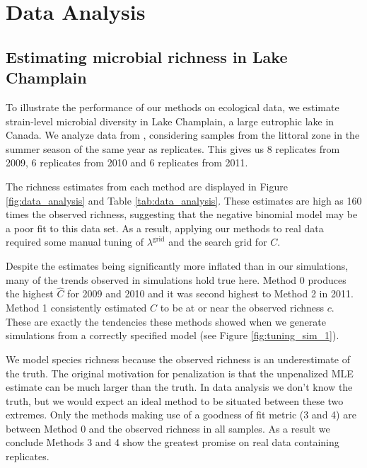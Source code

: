 \documentclass[12pt]{article}
\newcommand{\lambdagrid}{\lambda^{\text{grid}}}
\theoremstyle{break}
\theoremstyle{break}
\begin{document}
%

\def\spacingset#1{\renewcommand{\baselinestretch}%
{#1}\small\normalsize} \spacingset{1}



\section{Data Analysis}
\label{sec:data_analysis}

\subsection{Estimating microbial richness in Lake Champlain}

To illustrate the performance of our methods on ecological data, we estimate strain-level microbial diversity in Lake Champlain, a large eutrophic lake in Canada.  We analyze data from \citet{tromas_2017}, considering samples from the littoral zone in the summer season of the same year as replicates. This gives us 8 replicates from 2009, 6 replicates from 2010 and 6 replicates from 2011.  


The richness estimates from each method are displayed in Figure \ref{fig:data_analysis} and Table \ref{tab:data_analysis}.  These estimates are high as 160 times the observed richness, suggesting that the negative binomial model may be a poor fit to this data set.  As a result, applying our methods to real data required some manual tuning of $\lambdagrid$ and the search grid for $C$.

Despite the estimates being significantly more inflated than in our simulations, many of the trends observed in simulations hold true here.  Method 0 produces the highest $\widehat{C}$ for 2009 and 2010 and it was second highest to Method 2 in 2011.  Method 1 consistently estimated $\widehat{C}$ to be at or near the observed richness $c$.  These are exactly the tendencies these methods showed when we generate simulations from a correctly specified model (see Figure \ref{fig:tuning_sim_1}).

We model species richness because the observed richness is an underestimate of the truth.  The original motivation for penalization is that the unpenalized MLE estimate can be much larger than the truth.  In data analysis we don't know the truth, but we would expect an ideal method to be situated between these two extremes.  Only the methods making use of a goodness of fit metric (3 and 4) are between Method 0 and the observed richness in all samples.  As a result we conclude Methods 3 and 4 show the greatest promise on real data containing replicates.
\end{document}
